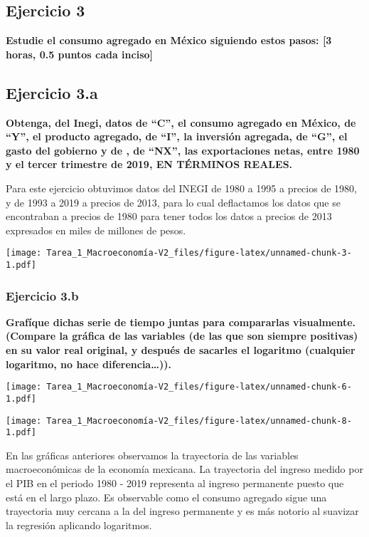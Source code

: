 \documentclass[
]{article}
\begin{document}
\hypertarget{ejercicio-3}{%
\subsection{Ejercicio 3}\label{ejercicio-3}}

\textbf{Estudie el consumo agregado en México siguiendo estos pasos:
{[}3 horas, 0.5 puntos cada inciso{]}}

\hypertarget{ejercicio-3.a}{%
\subsection{Ejercicio 3.a}\label{ejercicio-3.a}}

\textbf{Obtenga, del Inegi, datos de ``C'', el consumo agregado en
México, de ``Y'', el producto agregado, de ``I'', la inversión agregada,
de ``G'', el gasto del gobierno y de , de ``NX'', las exportaciones
netas, entre 1980 y el tercer trimestre de 2019, EN TÉRMINOS REALES.}

Para este ejercicio obtuvimos datos del INEGI de 1980 a 1995 a precios
de 1980, y de 1993 a 2019 a precios de 2013, para lo cual deflactamos
los datos que se encontraban a precios de 1980 para tener todos los
datos a precios de 2013 expresados en miles de millones de pesos.

\texttt{[image: Tarea\_1\_Macroeconomía-V2\_files/figure-latex/unnamed-chunk-3-1.pdf]}

\newpage

\hypertarget{ejercicio-3.b}{%
\subsubsection{Ejercicio 3.b}\label{ejercicio-3.b}}

\textbf{Grafíque dichas serie de tiempo juntas para compararlas
visualmente. (Compare la gráfica de las variables (de las que son
siempre positivas) en su valor real original, y después de sacarles el
logaritmo (cualquier logaritmo, no hace diferencia\ldots)).}

\texttt{[image: Tarea\_1\_Macroeconomía-V2\_files/figure-latex/unnamed-chunk-6-1.pdf]}

\texttt{[image: Tarea\_1\_Macroeconomía-V2\_files/figure-latex/unnamed-chunk-8-1.pdf]}

En las gráficas anteriores observamos la trayectoria de las variables
macroeconómicas de la economía mexicana. La trayectoria del ingreso
medido por el PIB en el periodo 1980 - 2019 representa al ingreso
permanente puesto que está en el largo plazo. Es observable como el
consumo agregado sigue una trayectoria muy cercana a la del ingreso
permanente y es más notorio al suavizar la regresión aplicando
logaritmos.
\end{document}
